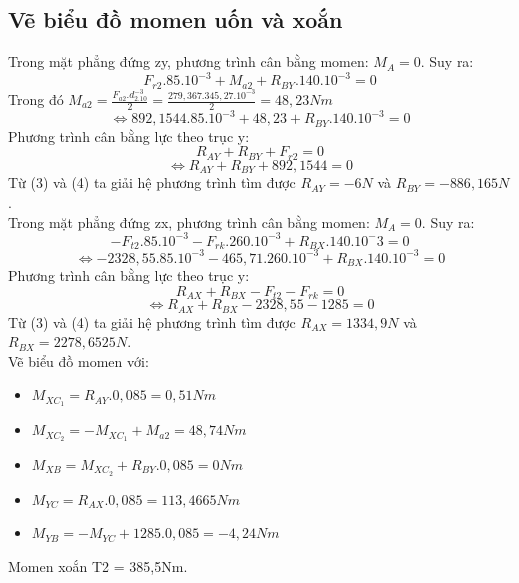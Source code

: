 \subsection{Vẽ biểu đồ momen uốn và xoắn}
Trong mặt phẳng đứng zy, phương trình cân bằng momen: $M_{A} = 0$. Suy ra:
\[
    F_{r2}.85.10^{-3} + M_{a2} + R_{BY}.140.10^{-3} = 0
\]
Trong đó $M_{a2} = \frac{F_{a2}.d_2.10^{-3}}{2} = \frac{279,367.345,27.10^{-3}}{2} = 48,23Nm$ \\
\begin{equation}
    \Leftrightarrow 892,1544.85.10^{-3} + 48,23 + R_{BY}.140.10^{-3} = 0
\end{equation}
Phương trình cân bằng lực theo trục y: \\
\[
    R_{AY}  + R_{BY} + F_{r2} = 0
\]
\begin{equation}
    \Leftrightarrow R_{AY} + R_{BY} + 892,1544 = 0
\end{equation}
Từ (3) và (4) ta giải hệ phương trình tìm được $R_{AY} = -6N$ và $R_{BY} = -886,165N$. \\
Trong mặt phẳng đứng zx, phương trình cân bằng momen: $M_{A} = 0$. Suy ra:
\[
    -F_{t2}.85.10^{-3} - F_{rk}.260.10^{-3} + R_{BX}.140.10^-3 = 0
\]
\begin{equation}
    \Leftrightarrow -2328,55.85.10^{-3} - 465,71.260.10^{-3} + R_{BX}.140.10^{-3} = 0
\end{equation}
Phương trình cân bằng lực theo trục y: \\
\[
    R_{AX} + R_{BX} - F_{t2} - F_{rk}= 0
\]
\begin{equation}
    \Leftrightarrow R_{AX} + R_{BX} - 2328,55 - 1285 = 0
\end{equation}
Từ (3) và (4) ta giải hệ phương trình tìm được $R_{AX} = 1334,9N$ và $R_{BX} = 2278,6525N$. \\
Vẽ biểu đồ momen với:
\begin{itemize}
    \item $M_{XC_1} = R_{AY}.0,085 = 0,51Nm$
    \item $M_{XC_2} = -M_{XC_1} + M_{a2} = 48,74Nm$
    \item $M_{XB} = M_{XC_2} + R_{BY}.0,085 = 0Nm$
    \item $M_{YC} = R_{AX}.0,085 = 113,4665Nm$
    \item $M_{YB} = - M_{YC} + 1285.0,085 = -4,24Nm$
\end{itemize}
Momen xoắn T2 = 385,5Nm. \\
